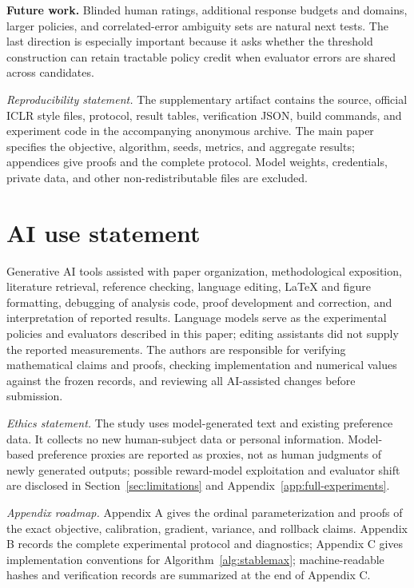 \documentclass{article}
\theoremstyle{definition}
\theoremstyle{remark}
\begin{document}
\textbf{Future work.} Blinded human ratings, additional response budgets and
domains, larger policies, and correlated-error ambiguity sets are natural next
tests.  The last direction is especially important because it asks whether the
threshold construction can retain tractable policy credit when evaluator errors
are shared across candidates.

\label{main-text-end}

\emph{Reproducibility statement.} The supplementary artifact contains the
source, official ICLR style files, protocol, result tables, verification JSON,
build commands, and experiment code in the accompanying anonymous archive.  The main paper specifies
the objective, algorithm, seeds, metrics, and aggregate results; appendices
give proofs and the complete protocol.  Model weights, credentials, private
data, and other non-redistributable files are excluded.

\section*{AI use statement}
Generative AI tools assisted with paper
organization, methodological exposition, literature retrieval, reference
checking, language editing, LaTeX and figure formatting, debugging of analysis
code, proof development and correction, and interpretation of reported results.  Language models serve as the experimental policies and evaluators described
in this paper; editing assistants did not supply the reported measurements. The authors are responsible for
verifying mathematical claims and proofs, checking implementation and numerical
values against the frozen records, and reviewing all AI-assisted changes
before submission.

\emph{Ethics statement.} The study uses model-generated text and existing
preference data.  It collects no new human-subject data or personal
information.  Model-based preference proxies are reported as proxies, not as
human judgments of newly generated outputs; possible reward-model exploitation
and evaluator shift are disclosed in Section~\ref{sec:limitations} and
Appendix~\ref{app:full-experiments}.
\clearpage


\clearpage
\appendix
\emph{Appendix roadmap.}
Appendix A gives the ordinal parameterization and proofs of the exact objective,
calibration, gradient, variance, and rollback claims.  Appendix B records the
complete experimental protocol and diagnostics; Appendix C gives implementation
conventions for Algorithm~\ref{alg:stablemax}; machine-readable hashes and
verification records are summarized at the end of Appendix C.
\makeatletter
\renewcommand{\theHtable}{appendix.\arabic{table}}
\renewcommand{\theHfigure}{appendix.\arabic{figure}}
\renewcommand{\theHalgocf}{appendix.\arabic{algocf}}
\makeatother



\end{document}
